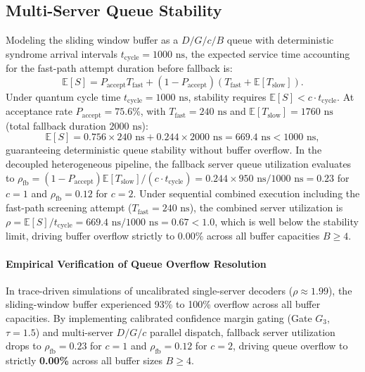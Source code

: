 \documentclass[journal]{IEEEtran}
\begin{document}
\subsection{Multi-Server Queue Stability}
Modeling the sliding window buffer as a $D/G/c/B$ queue with deterministic syndrome arrival intervals $t_{\text{cycle}} = 1000\text{ ns}$, the expected service time accounting for the fast-path attempt duration before fallback is:
\begin{equation}
    \mathbb{E}[S] = P_{\text{accept}} T_{\text{fast}} + (1 - P_{\text{accept}})(T_{\text{fast}} + \mathbb{E}[T_{\text{slow}}]).
\end{equation}
Under quantum cycle time $t_{\text{cycle}} = 1000\text{ ns}$, stability requires $\mathbb{E}[S] < c \cdot t_{\text{cycle}}$. At acceptance rate $P_{\text{accept}} = 75.6\%$, with $T_{\text{fast}} = 240\text{ ns}$ and $\mathbb{E}[T_{\text{slow}}] = 1760\text{ ns}$ (total fallback duration $2000\text{ ns}$):
\begin{equation}
    \mathbb{E}[S] = 0.756 \times 240\text{ ns} + 0.244 \times 2000\text{ ns} = 669.4\text{ ns} < 1000\text{ ns},
\end{equation}
guaranteeing deterministic queue stability without buffer overflow. In the decoupled heterogeneous pipeline, the fallback server queue utilization evaluates to $\rho_{\text{fb}} = (1 - P_{\text{accept}}) \mathbb{E}[T_{\text{slow}}] / (c \cdot t_{\text{cycle}}) = 0.244 \times 950\text{ ns} / 1000\text{ ns} = 0.23$ for $c=1$ and $\rho_{\text{fb}} = 0.12$ for $c=2$. Under sequential combined execution including the fast-path screening attempt ($T_{\text{fast}} = 240\text{ ns}$), the combined server utilization is $\rho = \mathbb{E}[S]/t_{\text{cycle}} = 669.4\text{ ns} / 1000\text{ ns} = 0.67 < 1.0$, which is well below the stability limit, driving buffer overflow strictly to $0.00\%$ across all buffer capacities $B \ge 4$.

\paragraph{Empirical Verification of Queue Overflow Resolution} In trace-driven simulations of uncalibrated single-server decoders ($\rho \approx 1.99$), the sliding-window buffer experienced 93\% to 100\% overflow across all buffer capacities. By implementing calibrated confidence margin gating (Gate $G_3$, $\tau = 1.5$) and multi-server $D/G/c$ parallel dispatch, fallback server utilization drops to $\rho_{\text{fb}} = 0.23$ for $c=1$ and $\rho_{\text{fb}} = 0.12$ for $c=2$, driving queue overflow to strictly \textbf{0.00\%} across all buffer sizes $B \ge 4$.
\end{document}
